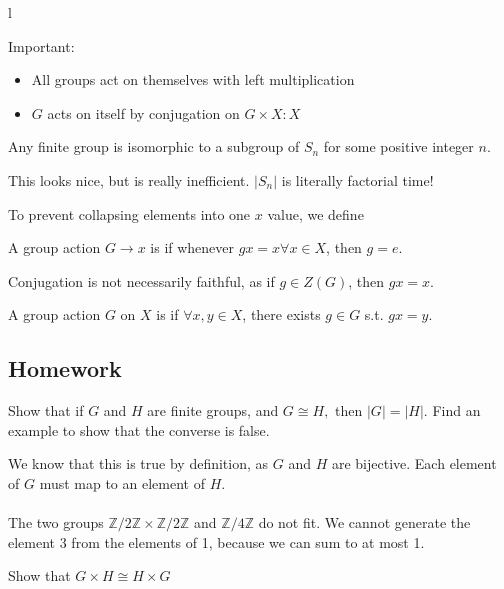 l\documentclass{scrartcl}
\begin{document}
Important: \\
\begin{itemize}
	\item All groups act on themselves with left multiplication
	\item $G$ acts on itself by conjugation on $G \times X : X$
\end{itemize}

\begin{theorem} 
	Any finite group is isomorphic to a subgroup of $S_n$ for some positive integer $n$.
\end{theorem}
This looks nice, but is really inefficient. $|S_n|$ is literally factorial time!

To prevent collapsing elements into one $x$ value, we define
\begin{definition} 
	A group action $G \rightarrow x$ is  if whenever $gx = x \forall x \in X$, then $g = e$.
\end{definition}
Conjugation is not necessarily faithful, as if $g \in Z(G)$, then $gx = x$.

\begin{definition}
	A group action $G$ on $X$ is  if $\forall x,y \in X$, there exists $g \in G$ s.t. $gx=y$.
\end{definition}

\subsection{Homework}
\begin{problem}[1]
	Show that if $G$ and $H$ are finite groups, and $G \cong H,$ then $|G| = |H|.$ Find an example to show that the converse is false.
\end{problem}

\begin{soln}
	We know that this is true by definition, as $G$ and $H$ are bijective. Each element of $G$ must map to an element of $H$. \\ \\
	The two groups $\mathbb{Z} / 2\mathbb{Z} \times \mathbb{Z} / 2\mathbb{Z}$ and $\mathbb{Z} / 4\mathbb{Z}$ do not fit. We cannot generate the element $3$ from the elements of 1, because we can sum to at most 1.
\end{soln}

\begin{problem}[2]
	Show that $G \times H \cong H \times G$
\end{problem}
\end{document}
